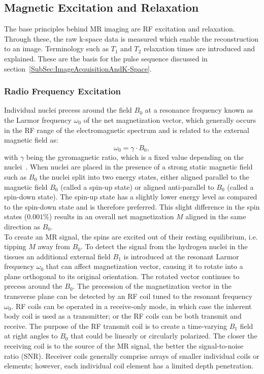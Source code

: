 \subsection{Magnetic Excitation and Relaxation} \label{SubSec:MagneticExcitationAndRelaxation}
The base principles behind MR imaging are RF excitation and relaxation. Through these, the raw k-space data is measured which enable the reconstruction to an image. Terminology such as $T_1$ and $T_2$ relaxation times are introduced and explained. These are the basis for the pulse sequence discussed in section~\ref{SubSec:ImageAcquisitionAndK-Space}.

\subsubsection{Radio Frequency Excitation}
Individual nuclei precess around the field $B_0$ at a
resonance frequency known as the Larmor frequency $\omega_0$ of the net magnetization vector, which generally occurs in the RF range of the electromagnetic spectrum and is related to the external magnetic field as:
\begin{equation} \label{eq:LarmorFrequency}
	\omega_0 = \gamma \cdot B_0,
\end{equation}
with $\gamma$ being the gyromagnetic ratio, which is a fixed value depending on the nuclei~\cite{SamplingStrategies}. When nuclei are placed in the presence of a strong static magnetic field such as $B_0$ the nuclei split into two energy states, either aligned parallel to the magnetic field $B_0$ (called a spin-up state) or aligned anti-parallel to $B_0$ (called a spin-down state). The spin-up state has a slightly lower energy level as compared to the spin-down state and is therefore preferred. This slight difference in the spin states ($0.001\%$) results in an overall net magnetization $M$ aligned in the same direction as $B_0$. \\
To create an MR signal, the spins are excited out of their resting equilibrium, i.e. tipping $M$ away from $B_0$. To detect the signal from the hydrogen nuclei in the tissues an additional external field $B_1$ is introduced at the resonant Larmor frequency $\omega_0$ that can affect magnetization vector, causing it to rotate into a plane orthogonal to its original orientation. The rotated vector continues to precess around the $B_0$. The precession of the magnetization vector in the transverse plane can be detected by an RF coil tuned to the resonant frequency $\omega_0$. RF coils can be operated in a receive-only mode, in which case the inherent body coil is used as a transmitter; or the RF coils can be both transmit and receive. The purpose of the RF transmit coil is to create a time-varying $B_1$ field at right angles to $B_0$ that could be linearly or circularly polarized. The closer the receiving coil is to the source of the MR signal, the better the signal-to-noise ratio (SNR). Receiver coils generally comprise arrays of smaller individual coils or elements; however, each individual coil element has a limited depth penetration. \\
